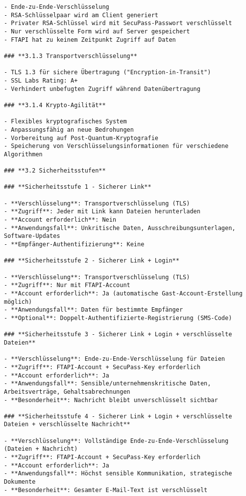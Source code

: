 \begin{Verbatim}[breaklines=true]
- Ende-zu-Ende-Verschlüsselung
- RSA-Schlüsselpaar wird am Client generiert
- Privater RSA-Schlüssel wird mit SecuPass-Passwort verschlüsselt
- Nur verschlüsselte Form wird auf Server gespeichert
- FTAPI hat zu keinem Zeitpunkt Zugriff auf Daten

### **3.1.3 Transportverschlüsselung**

- TLS 1.3 für sichere Übertragung ("Encryption-in-Transit")
- SSL Labs Rating: A+
- Verhindert unbefugten Zugriff während Datenübertragung

### **3.1.4 Krypto-Agilität**

- Flexibles kryptografisches System
- Anpassungsfähig an neue Bedrohungen
- Vorbereitung auf Post-Quantum-Kryptografie
- Speicherung von Verschlüsselungsinformationen für verschiedene Algorithmen

### **3.2 Sicherheitsstufen**

### **Sicherheitsstufe 1 - Sicherer Link**

- **Verschlüsselung**: Transportverschlüsselung (TLS)
- **Zugriff**: Jeder mit Link kann Dateien herunterladen
- **Account erforderlich**: Nein
- **Anwendungsfall**: Unkritische Daten, Ausschreibungsunterlagen, Software-Updates
- **Empfänger-Authentifizierung**: Keine

### **Sicherheitsstufe 2 - Sicherer Link + Login**

- **Verschlüsselung**: Transportverschlüsselung (TLS)
- **Zugriff**: Nur mit FTAPI-Account
- **Account erforderlich**: Ja (automatische Gast-Account-Erstellung möglich)
- **Anwendungsfall**: Daten für bestimmte Empfänger
- **Optional**: Doppelt-Authentifizierte-Registrierung (SMS-Code)

### **Sicherheitsstufe 3 - Sicherer Link + Login + verschlüsselte Dateien**

- **Verschlüsselung**: Ende-zu-Ende-Verschlüsselung für Dateien
- **Zugriff**: FTAPI-Account + SecuPass-Key erforderlich
- **Account erforderlich**: Ja
- **Anwendungsfall**: Sensible/unternehmenskritische Daten, Arbeitsverträge, Gehaltsabrechnungen
- **Besonderheit**: Nachricht bleibt unverschlüsselt sichtbar

### **Sicherheitsstufe 4 - Sicherer Link + Login + verschlüsselte Dateien + verschlüsselte Nachricht**

- **Verschlüsselung**: Vollständige Ende-zu-Ende-Verschlüsselung (Dateien + Nachricht)
- **Zugriff**: FTAPI-Account + SecuPass-Key erforderlich
- **Account erforderlich**: Ja
- **Anwendungsfall**: Höchst sensible Kommunikation, strategische Dokumente
- **Besonderheit**: Gesamter E-Mail-Text ist verschlüsselt


\end{Verbatim}
